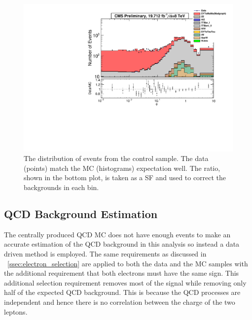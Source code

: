 \begin{figure}[!htbp]
    \centering
    \includegraphics[width=\textwidth]{figures/phistar_emu.pdf}
    \caption[
        The \phistar distribution of events from the \emu control sample.
    ]{
        The \phistar distribution of events from the \emu control sample. The
        data (points) match the MC (histograms) expectation well. The ratio,
        shown in the bottom plot, is taken as a SF and used to correct the
        backgrounds in each bin.
    }
    \label{fig:emu_background_check}
\end{figure}


\subsection{QCD Background Estimation}

The centrally produced QCD MC does not have enough events to make an accurate
estimation of the QCD background in this analysis so instead a data driven
method is employed. The same requirements as discussed in
\SEC~\ref{ssec:electron_selection} are applied to both the data and the MC
samples with the additional requirement that both electrons must have the same
sign. This additional selection requirement removes most of the signal while
removing only half of the expected QCD background. This is because the QCD
processes are independent and hence there is no correlation between the charge
of the two leptons.

